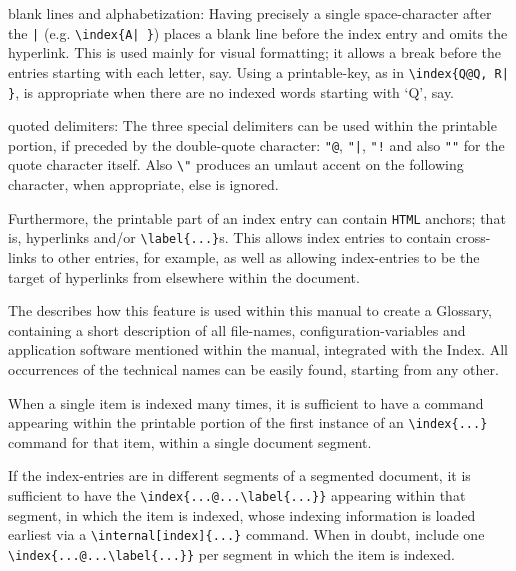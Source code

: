 \begin{htmllist}
%
%
\item [blank lines and alphabetization: ]
Having precisely a single space-character after the \verb+|+ 
(e.g. \verb+\index{A| }+) 
places a blank line before the index entry and omits the hyperlink.
This is used mainly for visual formatting; it allows a break before the entries
starting with each letter, say. Using a printable-key, as in \verb+\index{Q@Q, R| }+,
is appropriate when there are no indexed words starting with `Q', say.

%
\item [quoted delimiters: ]
The three special delimiters can be used within the printable portion,
if preceded by the double-quote character: \verb+"@+, \verb+"|+, \verb+"!+ 
and also \verb+""+ for the quote character itself. 
Also \verb|\"| produces an umlaut accent on the following character, 
when appropriate, else is ignored.
%
\end{htmllist}%

%
\html{\\}\noindent
%
Furthermore, the printable part of an index entry can contain \texttt{HTML}
anchors; that is, hyperlinks and/or \verb|\label{...}|s.
This allows index entries to contain cross-links to other entries, for example,
as well as allowing index-entries to be the target of hyperlinks from elsewhere
within the document. 

The  describes how this feature is used within this
manual to create a Glossary, containing a short description of all file-names,
configuration-variables and application software mentioned within the manual,
integrated with the Index. All occurrences of the technical names can be
easily found, starting from any other.


When a single item is indexed many times, it is sufficient 
to have a  command appearing within the printable portion 
of the first instance of an \verb|\index{...}| command for that item,
within a single document segment. 

\medskip

If the index-entries are in different segments of a segmented document, 
it is sufficient to have the  \verb|\index{...@...\label{...}}| appearing 
within that segment, in which the item is indexed, whose indexing information 
is loaded earliest via a \verb|\internal[index]{...}| command.
When in doubt, include one \verb|\index{...@...\label{...}}| per segment 
in which the item is indexed.

